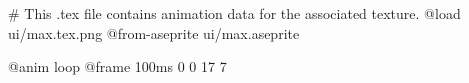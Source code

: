 # This .tex file contains animation data for the associated texture.
@load ui/max.tex.png
@from-aseprite ui/max.aseprite

@anim loop
	@frame 100ms 0 0 17 7

